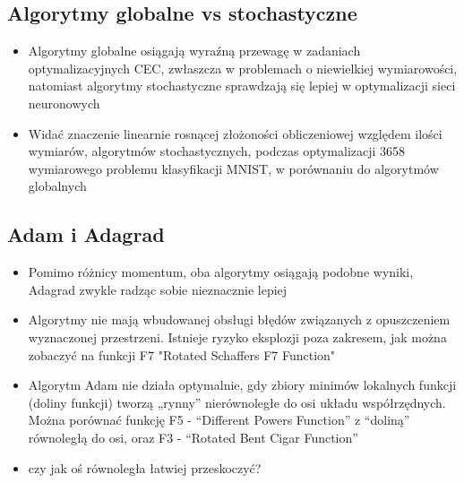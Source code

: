 
\subsection*{Algorytmy globalne vs stochastyczne}
\begin{itemize}
    \item Algorytmy globalne osiągają wyraźną przewagę w zadaniach optymalizacyjnych CEC, zwłaszcza w problemach o niewielkiej wymiarowości, natomiast algorytmy stochastyczne sprawdzają się lepiej w optymalizacji sieci neuronowych

    \item Widać znaczenie linearnie rosnącej złożoności obliczeniowej względem ilości wymiarów, algorytmów stochastycznych, podczas optymalizacji 3658 wymiarowego problemu klasyfikacji MNIST, w porównaniu do algorytmów globalnych
    

\end{itemize}


\subsection*{Adam i Adagrad}
\begin{itemize}
    \item Pomimo różnicy momentum, oba algorytmy osiągają podobne wyniki, Adagrad zwykle radząc sobie nieznacznie lepiej

    \item Algorytmy nie mają wbudowanej obsługi błędów związanych z opuszczeniem wyznaczonej przestrzeni. Istnieje ryzyko eksplozji poza zakresem, jak można zobaczyć na funkcji F7 "Rotated Schaffers F7 Function"


    \item Algorytm Adam nie działa optymalnie, gdy zbiory minimów lokalnych funkcji (doliny funkcji) tworzą „rynny” nierównoległe do osi układu współrzędnych. Można porównać funkcję F5 - ``Different Powers Function'' z ``doliną'' równoległą do osi, oraz F3 - ``Rotated Bent Cigar Function''
    
    \item czy jak oś równoległa łatwiej przeskoczyć?

\end{itemize}



